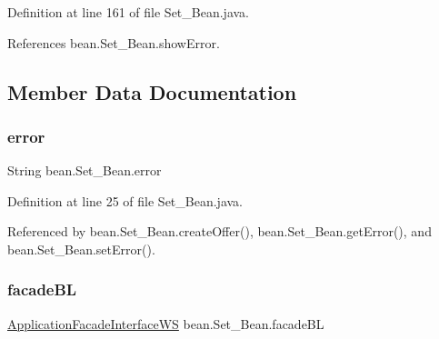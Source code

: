 Definition at line 161 of file Set\+\_\+\+Bean.\+java.


\begin{DoxyCode}{0}

\end{DoxyCode}


References bean.\+Set\+\_\+\+Bean.\+show\+Error.



\subsection{Member Data Documentation}
\mbox{\label{classbean_1_1Set__Bean_aa0023cab21fcce9d36c517f53940f3ff}} 
\subsubsection{\texorpdfstring{error}{error}}
{\footnotesize\ttfamily String bean.\+Set\+\_\+\+Bean.\+error\hspace{0.3cm}{\ttfamily [package]}}



Definition at line 25 of file Set\+\_\+\+Bean.\+java.



Referenced by bean.\+Set\+\_\+\+Bean.\+create\+Offer(), bean.\+Set\+\_\+\+Bean.\+get\+Error(), and bean.\+Set\+\_\+\+Bean.\+set\+Error().

\mbox{\label{classbean_1_1Set__Bean_afdf90e7df10b28094116c50ee84df11d}} 
\subsubsection{\texorpdfstring{facadeBL}{facadeBL}}
{\footnotesize\ttfamily \mbox{\hyperlink{interfacebusinessLogic_1_1ApplicationFacadeInterfaceWS}{Application\+Facade\+Interface\+WS}} bean.\+Set\+\_\+\+Bean.\+facade\+BL\hspace{0.3cm}{\ttfamily [private]}}



